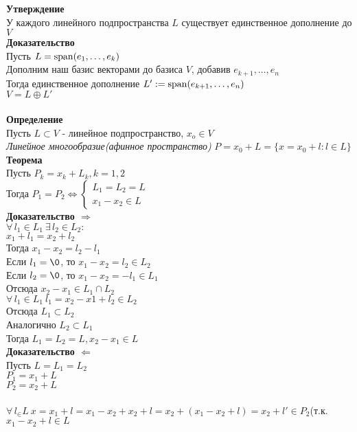 \documentclass[12pt]{article}
\begin{document}
\textbf{Утверждение}\\
У каждого линейного подпространства $L$ существует единственное дополнение до $V$\\
\textbf{Доказательство}\\
Пусть $L = \operatorname{span}(e_1,\ldots,e_k)$\\
Дополним наш базис векторами до базиса $V$, добавив $e_{k+1},\ldots,e_n$\\
Тогда единственное дополнение $L' := \operatorname{span}(e_{k+1}, \ldots, e_n)$\\
$V = L \oplus L'$\\\\
\textbf{Определение}\\
Пусть $L\subset V$ - линейное подпространство, $x_o \in V$\\
\textit{Линейное многообразие(афинное пространство)} $P = x_0 + L = \{x=x_0 + l : l \in L\}$\\
\textbf{Теорема}\\
Пусть $P_k = x_k + L_k, k =1,2$\\
Тогда $P_1 = P_2 \Leftrightarrow \left\{\begin{array}{l}
     L_1 = L_2 = L\\
     x_1 - x_2 \in L
\end{array}\right.$\\
\textbf{Доказательство $\Rightarrow$}\\
$\forall\,l_1 \in L_1\ \exists\,l_2 \in L_2:$\\
$x_1 + l_1 = x_2 + l_2$\\
Тогда $x_1-x_2 = l_2-l_1$\\
Если $l_1 = \0$, то $x_1-x_2 = l_2 \in L_2$\\
Если $l_2 = \0$, то $x_1-x_2 = -l_1 \in L_1$\\
Отсюда $x_2-x_1 \in L_1 \cap L_2$\\
$\forall\,l_1 \in L_1\ l_1 = x_2-x1+l_2 \in L_2$\\
Отсюда $L_1 \subset L_2$\\
Аналогично $L_2 \subset L_1$\\
Тогда $L_1 = L_2 = L, x_2-x_1 \in L$\\
\textbf{Доказательство $\Leftarrow$}\\
Пусть $L = L_1 = L_2$\\
$P_1 = x_1+L$\\
$P_2 = x_2 + L$\\\\
$\forall\,l_\in L\ x=x_1+l = x_1-x_2+x_2+l = x_2 + (x_1-x_2+l) = x_2 + l' \in P_2$(т.к. $x_1-x_2+l \in L$\\
\end{document}
